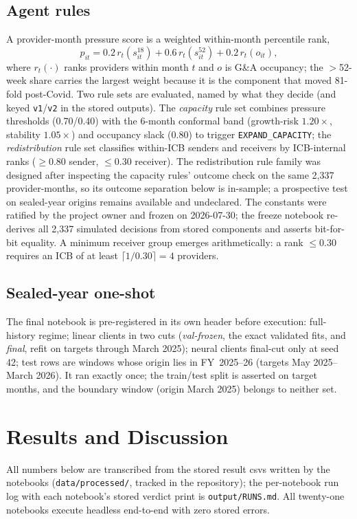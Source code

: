 \documentclass[conference]{IEEEtran}
\begin{document}
\subsection{Agent rules}
A provider-month pressure score is a weighted within-month percentile rank,
\begin{equation}
p_{it} = 0.2\,r_t(s^{18}_{it}) + 0.6\,r_t(s^{52}_{it}) + 0.2\,r_t(o_{it}),
\end{equation}
where $r_t(\cdot)$ ranks providers within month $t$ and $o$ is G\&A occupancy; the $>$52-week share
carries the largest weight because it is the component that moved 81-fold post-Covid. Two rule
sets are evaluated, named by what they decide (and keyed \texttt{v1}/\texttt{v2} in the stored
outputs). The \emph{capacity} rule set combines pressure thresholds (0.70/0.40) with the 6-month
conformal band (growth-risk $1.20\times$, stability $1.05\times$) and occupancy slack (0.80) to
trigger \texttt{EXPAND\_CAPACITY}; the \emph{redistribution} rule set classifies within-ICB
senders and receivers by ICB-internal ranks ($\geq 0.80$ sender, $\leq 0.30$ receiver).
The redistribution rule family was designed after inspecting the capacity rules' outcome check on
the same 2{,}337 provider-months, so its outcome separation below is in-sample; a prospective test
on sealed-year origins remains available and undeclared. The constants were ratified by the
project owner and frozen on 2026-07-30; the freeze notebook re-derives all 2{,}337
simulated decisions from stored components and asserts bit-for-bit equality. A minimum receiver
group emerges arithmetically: a rank $\leq 0.30$ requires an ICB of at least
$\lceil 1/0.30 \rceil = 4$ providers.

\subsection{Sealed-year one-shot}
The final notebook is pre-registered in its own header before execution: full-history regime;
linear clients in two cuts (\emph{val-frozen}, the exact validated fits, and \emph{final},
refit on targets through March 2025); neural clients final-cut only at seed 42; test rows are
windows whose origin lies in FY~2025--26 (targets May 2025--March 2026). It ran exactly once; the
train/test split is asserted on target months, and the boundary window (origin March 2025) belongs
to neither set.

\section{Results and Discussion}\label{sec:results}
All numbers below are transcribed from the stored result csvs written by the notebooks
(\texttt{data/processed/}, tracked in the repository); the per-notebook run log with each
notebook's stored verdict print is \texttt{output/RUNS.md}. All twenty-one notebooks execute
headless end-to-end with zero stored errors.
\end{document}
